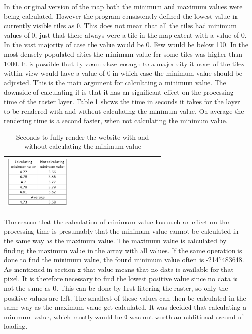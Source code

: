 In the original version of the map both the minimum and maximum values were being calculated. However the program consistently defined the lowest value in currently visible tiles as 0.
This does not mean that all the tiles had minimum values of 0, just that there always were a tile in the map extent with a value of 0. In the vast majority of case the value would be 0. Few would be below 100. In the most densely populated cities the minimum value for some tiles was higher than 1000. 
It is possible that by zoom close enough to a major city it none of the tiles within view would have a value of 0 in which case the minimum value should be adjusted.
This is the main argument for calculating a minimum value. The downside of calculating it is that it has an significant effect on the processing time of the raster layer. Table \ref{tabMinimum} shows the time in seconds it takes for the layer to be rendered with and without calculating the minimum value. On average the rendering time is a second faster, when not calculating the minimum value.

\begin{table}[htbp]
	\centering
	\begin{tabular}{l}
		\includegraphics[width=0.4\textwidth]{Pictures/tabMinimum}
	\end{tabular}
	\caption{Seconds to fully render the website with and without calculating the minimum value}
	\label{tabMinimum}
\end{table}

The reason that the calculation of minimum value has such an effect on the processing time is presumably that the minimum value cannot be calculated in the same way as the maximum value. 
The maximum value is calculated by finding the maximum value in the array with all values. 
If the same operation is done to find the minimum value, the found minimum value often is -2147483648. As mentioned in section x that value means that no data is available for that pixel. 
It is therefore necessary to find the lowest positive value since no data is not the same as 0. This can be done by first filtering the raster, so only the positive values are left. The smallest of these values can then be calculated in the same way as the maximum value get calculated. 
It was decided that calculating a minimum value, which mostly would be 0 was not worth an additional second of loading. 
